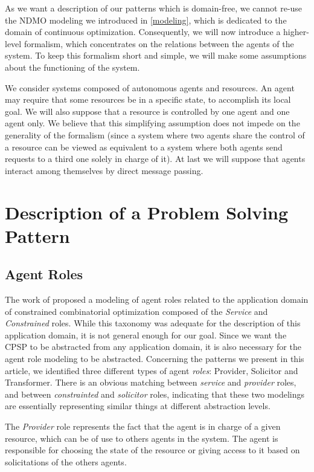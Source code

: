 As we want a description of our patterns which is domain-free, we cannot re-use the NDMO modeling we introduced in \ref{modeling}, which is dedicated to the domain of continuous optimization. Consequently, we will now introduce a higher-level formalism, which concentrates on the relations between the agents of the system. To keep this formalism short and simple, we will make some assumptions about the functioning of the system.

We consider systems composed of autonomous agents and resources. An agent may require that some resources be in a specific state, to accomplish its local goal. We will also suppose that a resource is controlled by one agent and one agent only. We believe that this simplifying assumption does not impede on the generality of the formalism (since a system where two agents share the control of a resource can be viewed as equivalent to a system where both agents send requests to a third one solely in charge of it). At last we will suppose that agents interact among themselves by direct message passing.

\section{Description of a Problem Solving Pattern}

\subsection{Agent Roles}\label{CPSP_roles}

The work of \cite{Ka2011.6} proposed a modeling of agent roles related to the application domain of constrained combinatorial optimization composed of the \emph{Service} and \emph{Constrained} roles. While this taxonomy was adequate for the description of this application domain, it is not general enough for our goal. Since we want the CPSP to be abstracted from any application domain, it is also necessary for the agent role modeling to be abstracted. Concerning the patterns we present in this article, we identified three different types of agent \emph{roles}: Provider, Solicitor and Transformer. There is an obvious matching between \emph{service} and \emph{provider} roles, and between \emph{constrainted} and \emph{solicitor} roles, indicating that these two modelings are essentially representing similar things at different abstraction levels.

The \emph{Provider} role represents the fact that the agent is in charge of a given resource, which can be of use to others agents in the system. The agent is responsible for choosing the state of the resource or giving access to it based on solicitations of the others agents.

